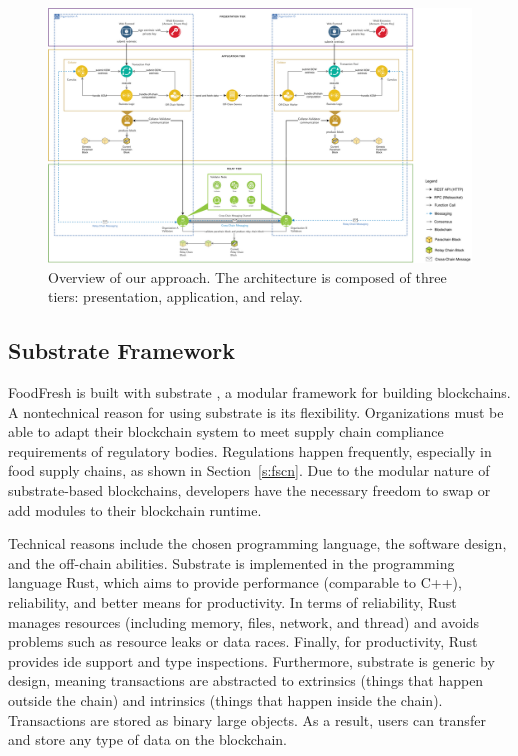 \documentclass[conference]{IEEEtran}
\begin{document}
\begin{figure}[h]
	\centering
	\includegraphics[width=\linewidth]{tiers_overview}
	\caption{Overview of our approach. The architecture is composed of three tiers: presentation, application, and relay. }
	\label{fig:system_architecture}
\end{figure}

\subsection{Substrate Framework} \label{substrate_framework}
FoodFresh is built with substrate \cite{substrateio}, a modular framework for building blockchains. A nontechnical reason for using substrate is its flexibility. Organizations must be able to adapt their blockchain system to meet supply chain compliance requirements of regulatory bodies. Regulations happen frequently, especially in food supply chains, as shown in Section~\ref{s:fscn}. Due to the modular nature of substrate-based blockchains, developers have the necessary freedom to swap or add modules to their blockchain runtime.

Technical reasons include the chosen programming language, the software design, and the off-chain abilities. Substrate is implemented in the programming language Rust, which aims to provide performance (comparable to C++), reliability, and better means for productivity. In terms of reliability, Rust manages resources (including memory, files, network, and thread) and avoids problems such as resource leaks or data races. Finally, for productivity, Rust provides \ac{ide} support and type inspections. Furthermore, substrate is generic by design, meaning transactions are abstracted to extrinsics (things that happen outside the chain) and intrinsics (things that happen inside the chain). Transactions are stored as binary large objects. As a result, users can transfer and store any type of data on the blockchain. 
\end{document}
